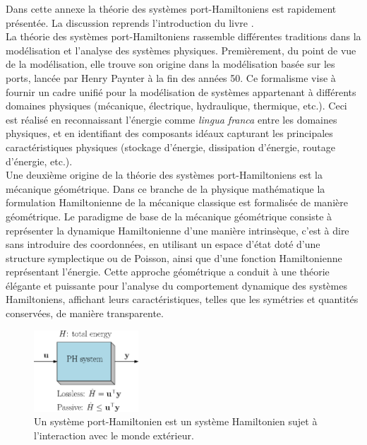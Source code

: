 \documentclass[12pt, french]{article}
\begin{document}
Dans cette annexe la théorie des systèmes port-Hamiltoniens est rapidement présentée. La discussion reprends l'introduction du livre \cite{van2014port}. \\

La théorie des systèmes port-Hamiltoniens rassemble différentes traditions dans la modélisation et l'analyse des systèmes physiques. Premièrement, du point de vue de la modélisation, elle trouve son origine dans la modélisation basée sur les ports, lancée par Henry Paynter à la fin des années 50. Ce formalisme vise à fournir un cadre unifié pour la modélisation de systèmes appartenant à différents domaines physiques (mécanique, électrique, hydraulique, thermique, etc.). Ceci est réalisé en reconnaissant l'énergie comme \textit{lingua franca} entre les domaines physiques, et en identifiant des composants idéaux capturant les principales caractéristiques physiques (stockage d'énergie, dissipation d'énergie, routage d'énergie, etc.).  \\

Une deuxième origine de la théorie des systèmes port-Hamiltoniens est la mécanique géométrique. Dans ce branche de la physique mathématique la formulation Hamiltonienne de la mécanique classique est formalisée de manière géométrique. Le paradigme de base
de la mécanique géométrique consiste à représenter la dynamique Hamiltonienne d'une manière intrinsèque, c'est à dire sans introduire des coordonnées, en utilisant un espace d'état doté d'une structure symplectique ou de Poisson, ainsi que d'une fonction Hamiltonienne représentant l'énergie. Cette
approche géométrique a conduit à une théorie élégante et puissante pour
l'analyse du comportement dynamique des systèmes Hamiltoniens, affichant leurs caractéristiques, telles que les symétries et quantités conservées, de manière transparente. \\

\begin{figure}[hbt]
	\begin{center}
		\includegraphics[width=0.35\textwidth]{sketch_PH.eps}
	\end{center}
	\caption{Un système port-Hamiltonien est un système Hamiltonien sujet \`a l'interaction avec le monde extérieur.}
	\label{fig:sketchPH}
\end{figure}
\end{document}
